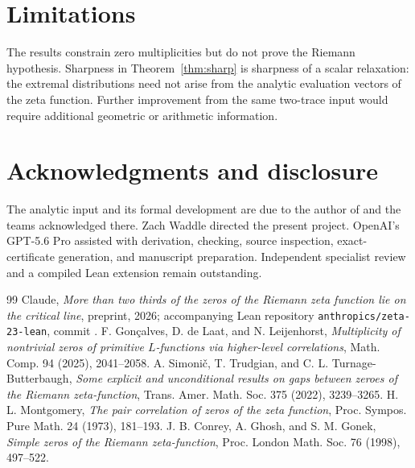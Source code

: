 \section{Limitations}

The results constrain zero multiplicities but do not prove the Riemann hypothesis. Sharpness in Theorem~\ref{thm:sharp} is sharpness of a scalar relaxation: the extremal distributions need not arise from the analytic evaluation vectors of the zeta function. Further improvement from the same two-trace input would require additional geometric or arithmetic information.

\section*{Acknowledgments and disclosure}
The analytic input and its formal development are due to the author of \cite{Claude2026} and the teams acknowledged there. Zach Waddle directed the present project. OpenAI's GPT-5.6 Pro assisted with derivation, checking, source inspection, exact-certificate generation, and manuscript preparation. Independent specialist review and a compiled Lean extension remain outstanding.

\begin{thebibliography}{99}
\small
{} Claude, \emph{More than two thirds of the zeros of the Riemann zeta function lie on the critical line}, preprint, 2026; accompanying Lean repository \texttt{anthropics/zeta-23-lean}, commit .
 F. Gon\c{c}alves, D. de Laat, and N. Leijenhorst, \emph{Multiplicity of nontrivial zeros of primitive $L$-functions via higher-level correlations}, Math. Comp. 94 (2025), 2041--2058.
 A. Simoni\v{c}, T. Trudgian, and C. L. Turnage-Butterbaugh, \emph{Some explicit and unconditional results on gaps between zeroes of the Riemann zeta-function}, Trans. Amer. Math. Soc. 375 (2022), 3239--3265.
 H. L. Montgomery, \emph{The pair correlation of zeros of the zeta function}, Proc. Sympos. Pure Math. 24 (1973), 181--193.
 J. B. Conrey, A. Ghosh, and S. M. Gonek, \emph{Simple zeros of the Riemann zeta-function}, Proc. London Math. Soc. 76 (1998), 497--522.
\end{thebibliography}
